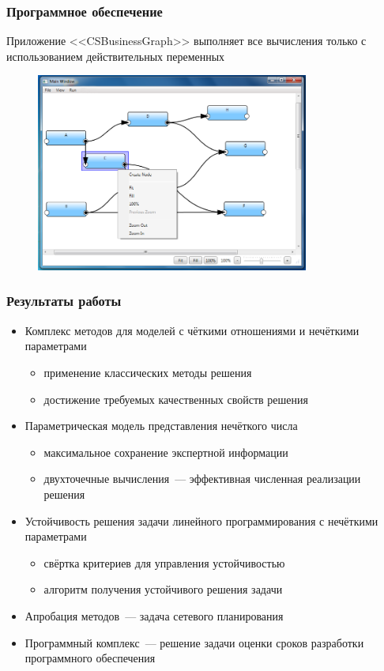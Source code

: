 \documentclass[12pt]{beamer}
\begin{document}

\begin{frame}
  \frametitle{Программное обеспечение}
  Приложение <<CSBusinessGraph>> выполняет все вычисления только с использованием действительных переменных
  \begin{figure}
    \center
    \includegraphics[width=0.8\textwidth]{app-sample-graph.png}
  \end{figure}
\end{frame}


\begin{frame}
  \frametitle{Результаты работы}
  \begin{itemize}
    \item Комплекс методов для моделей с чёткими отношениями и нечёткими параметрами
    \begin{itemize}
      \item применение классических методы решения
      \item достижение требуемых качественных свойств решения
    \end{itemize}
    \item Параметрическая модель представления нечёткого числа
    \begin{itemize}
      \item максимальное сохранение экспертной информации
      \item двухточечные вычисления~--- эффективная численная реализации решения
    \end{itemize}
    \item Устойчивость решения задачи линейного программирования с нечёткими параметрами
    \begin{itemize}
      \item свёртка критериев для управления устойчивостью
      \item алгоритм получения устойчивого решения задачи
    \end{itemize}
    \item Апробация методов~--- задача сетевого планирования
    \item Программный комплекс~--- решение задачи оценки сроков разработки программного обеспечения
  \end{itemize}
\end{frame}
\end{document}
